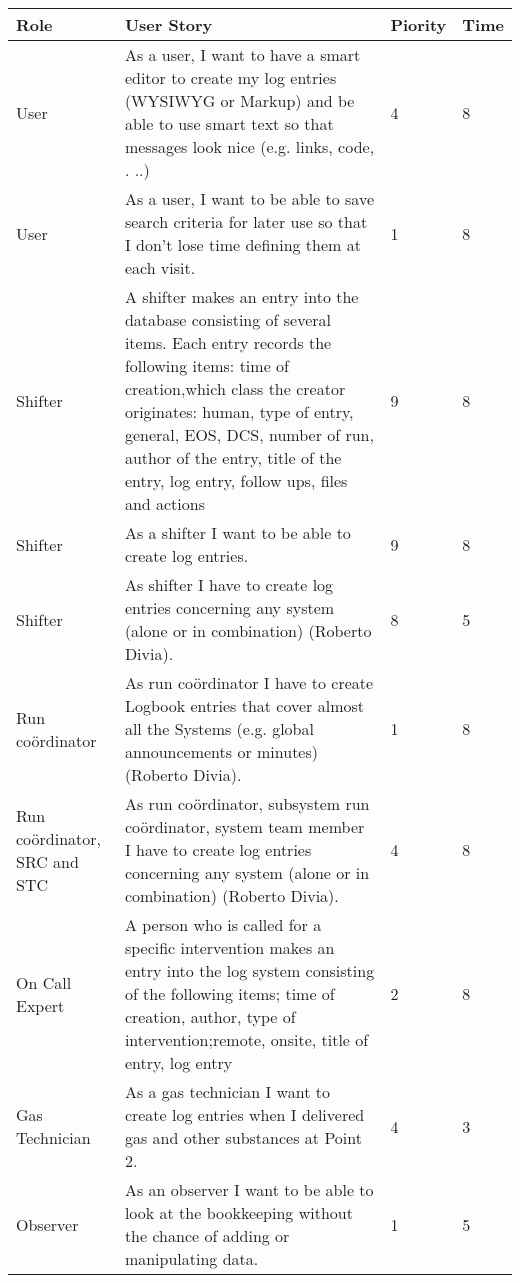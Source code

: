 \begin{longtable}{ | p{2cm} | p{8cm} | p{1.5cm} | l |}
\hline
Role & User Story & Piority & Time \\ \hline
User &  As a user, I want to have a smart editor to create my log entries
(WYSIWYG or Markup) and be able to use smart text so that messages look nice (e.g. links, code, . ..)& 4 & 8 \\ \hline
User &  As a user, I want to be able to save search criteria for later use so that I don’t lose time defining them at each visit. & 1 & 8 \\ \hline
Shifter &  A shifter makes an entry into the database consisting of several items. Each entry records the following items: time of creation,which class the creator originates: human, type of entry, general, EOS, DCS, number of run, author of the entry, title of the entry, log entry, follow ups, files and actions & 9 & 8 \\ \hline
Shifter &  As a shifter I want to be able to create log entries. & 9 & 8 \\ \hline
Shifter & As shifter I have to create log entries concerning any system (alone or in combination) (Roberto Divia). & 8 & 5 \\ \hline
Run coördinator & As run coördinator I have to create Logbook entries that cover almost all the Systems (e.g. global announcements or minutes) (Roberto Divia). & 1 & 8 \\ \hline
Run coördinator, SRC and STC & As run coördinator, subsystem run coördinator, system team member I have to create log entries concerning any system (alone or in combination) (Roberto Divia). & 4 & 8 \\ \hline
\newpage
\hline
On Call Expert & A person who is called for a specific intervention makes an entry into the log system consisting of the following items; time of creation, author, type of intervention;remote, onsite, title of entry, log entry & 2 & 8 \\ \hline
Gas Technician & As a gas technician I want to create log entries when I delivered gas
and other substances at Point 2. & 4 & 3 \\ \hline
Observer &  As an observer I want to be able to look at the bookkeeping without
the chance of adding or manipulating data. & 1 & 5 \\ \hline 
\end{longtable}

